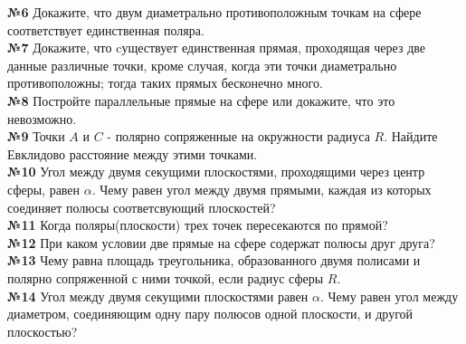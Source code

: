     \textbf{№6} Докажите, что двум диаметрально противоположным точкам на сфере соответствует единственная поляра.\\

    \textbf{№7} Докажите, что cуществует единственная прямая, проходящая через две данные различные точки,
    кроме случая, когда эти точки диаметрально противоположны;
    тогда таких прямых бесконечно много.\\

    \textbf{№8} Постройте параллельные прямые на сфере или докажите, что это невозможно.\\

    \textbf{№9} Точки $A$ и $C$ - полярно сопряженные на окружности радиуса $R$.
    Найдите Евклидово расстояние между этими точками.\\

    \textbf{№10} Угол между двумя секущими плоскостями, проходящими через центр сферы, равен $\alpha$.
    Чему равен угол между двумя прямыми,
    каждая из которых соединяет полюсы соответсвующий плоскостей?\\

    \textbf{№11} Когда поляры(плоскости) трех точек пересекаются по прямой?\\

    \textbf{№12} При каком условии две прямые на сфере содержат полюсы друг друга?\\

    \textbf{№13} Чему равна площадь треугольника, образованного двумя полисами и полярно сопряженной с ними точкой,
    если радиус сферы $R$.\\

    \textbf{№14} Угол между двумя секущими плоскостями равен $\alpha$.
    Чему равен угол между диаметром, соединяющим одну пару полюсов одной плоскости, и другой плоскостью?\\


